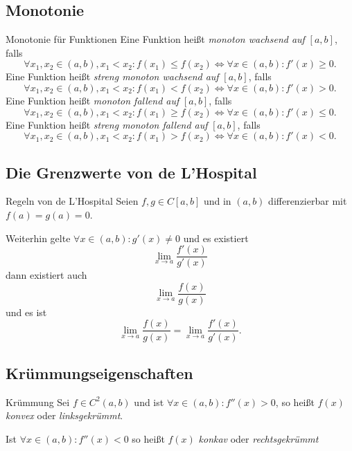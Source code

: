 \documentclass[german]{spicker}
\begin{document}
\subsection{Monotonie}

\begin{defi}{Monotonie für Funktionen}
    Eine Funktion heißt \emph{monoton wachsend auf} $[a, b]$, falls
    $$
        \forall x_1, x_2 \in (a, b), x_1 < x_2 : f(x_1) \leq f(x_2) \iff \forall x \in (a, b): f'(x) \geq 0.
    $$
    Eine Funktion heißt \emph{streng monoton wachsend auf} $[a, b]$, falls
    $$
        \forall x_1, x_2 \in (a, b), x_1 < x_2 : f(x_1) < f(x_2) \iff \forall x \in (a, b): f'(x) > 0.
    $$
    Eine Funktion heißt \emph{monoton fallend auf} $[a, b]$, falls
    $$
        \forall x_1, x_2 \in (a, b), x_1 < x_2 : f(x_1) \geq f(x_2) \iff \forall x \in (a, b): f'(x) \leq 0.
    $$
    Eine Funktion heißt \emph{streng monoton fallend auf} $[a, b]$, falls
    $$
        \forall x_1, x_2 \in (a, b), x_1 < x_2 : f(x_1) > f(x_2) \iff \forall x \in (a, b): f'(x) < 0.
    $$
\end{defi}

\subsection{Die Grenzwerte von de L'Hospital}

\begin{defi}{Regeln von de L'Hospital}
    Seien $f, g \in C[a, b]$ und in $(a, b)$ differenzierbar mit $f(a) = g(a) = 0$.

    Weiterhin gelte $\forall x \in (a, b): g'(x) \neq 0$ und es existiert
    $$
        \lim_{x\to a} \frac{f'(x)}{g'(x)}
    $$
    dann existiert auch
    $$
        \lim_{x\to a } \frac{f(x)}{g(x)}
    $$
    und es ist
    $$
        \lim_{x\to a } \frac{f(x)}{g(x)} = \lim_{x\to a} \frac{f'(x)}{g'(x)}.
    $$
\end{defi}

\subsection{Krümmungseigenschaften}

\begin{defi}{Krümmung}
    Sei $f\in C^2(a, b)$ und ist $\forall x \in (a, b) : f''(x) > 0$, so heißt $f(x)$ \emph{konvex} oder \emph{linksgekrümmt}.

    Ist $\forall x \in (a, b) : f''(x) < 0$ so heißt $f(x)$ \emph{konkav} oder \emph{rechtsgekrümmt}
\end{defi}
\end{document}
